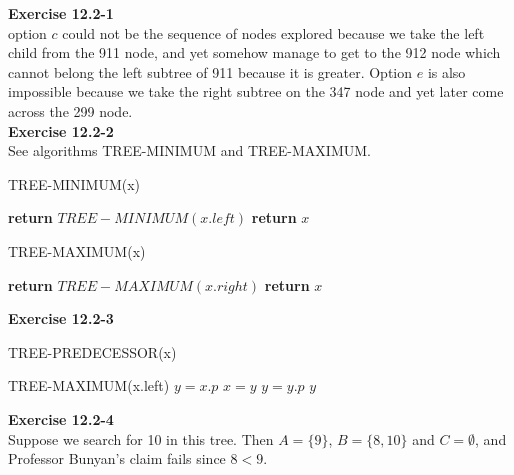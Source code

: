 \documentclass{article}
\begin{document}
\noindent\textbf{ Exercise 12.2-1} \\

option $c$ could not be the sequence of nodes explored because we take the left child from the 911 node, and yet somehow manage to get to the 912 node which cannot belong the left subtree of 911 because it is greater. Option $e$ is also impossible because we take the right subtree on the 347 node and yet later come across the 299 node.\\

\noindent\textbf{Exercise 12.2-2}\\

See algorithms TREE-MINIMUM and TREE-MAXIMUM. \\

\begin{algorithm}
\caption{TREE-MINIMUM(x)}
\begin{algorithmic}
	\State \textbf{return} $TREE-MINIMUM(x.left)$
\Else
\State \textbf{return} $x$
\EndIf
\end{algorithmic}
\end{algorithm}

\begin{algorithm}
\caption{TREE-MAXIMUM(x)}
\begin{algorithmic}
	\State \textbf{return} $TREE-MAXIMUM(x.right)$
\Else
\State \textbf{return} $x$
\EndIf
\end{algorithmic}
\end{algorithm}

\noindent\textbf{ Exercise 12.2-3} \\

\begin{algorithm}
\caption{TREE-PREDECESSOR(x)}
\begin{algorithmic}
\State \Return TREE-MAXIMUM(x.left)
\EndIf
\State $y = x.p$
\State $x=y$
\State $y=  y.p$
\EndWhile
\State\Return $y$
\end{algorithmic}
\end{algorithm}

\noindent\textbf{Exercise 12.2-4}\\

Suppose we search for 10 in this tree.  Then $A = \{9\}$, $B = \{8,10\}$ and $C = \emptyset$, and Professor Bunyan's claim fails since $8 < 9$.

\end{document}
